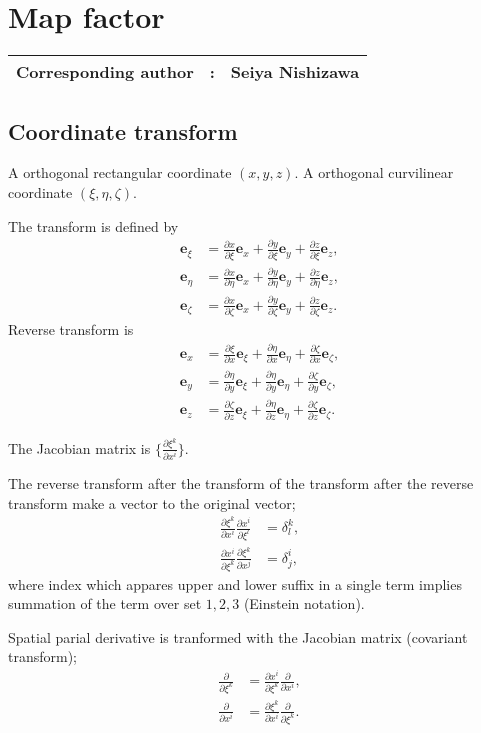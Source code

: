 \documentclass{book}
\begin{document}
\chapter{Map factor}
\label{chap: map factor}
{\bf \Large 
\begin{tabular}{ccc}
\hline
  Corresponding author & : & Seiya Nishizawa\\
\hline
\end{tabular}
}

\newcommand{\pd}[2]{\frac{\partial #1}{\partial #2}}


\section{Coordinate transform}
A orthogonal rectangular coordinate $(x, y, z)$.
A orthogonal curvilinear coordinate $(\xi, \eta, \zeta)$.


The transform is defined by
\begin{align}
  \bm{e}_\xi &= \pd{x}{\xi}\bm{e}_x + \pd{y}{\xi}\bm{e}_y + \pd{z}{\xi}\bm{e}_z, \\
  \bm{e}_\eta &= \pd{x}{\eta}\bm{e}_x + \pd{y}{\eta}\bm{e}_y + \pd{z}{\eta}\bm{e}_z, \\
  \bm{e}_\zeta &= \pd{x}{\zeta}\bm{e}_x + \pd{y}{\zeta}\bm{e}_y + \pd{z}{\zeta}\bm{e}_z.
\end{align}
Reverse transform is
\begin{align}
  \bm{e}_x &= \pd{\xi}{x}\bm{e}_\xi + \pd{\eta}{x}\bm{e}_\eta + \pd{\zeta}{x}\bm{e}_\zeta, \\
  \bm{e}_y &= \pd{\eta}{y}\bm{e}_\xi + \pd{\eta}{y}\bm{e}_\eta + \pd{\zeta}{y}\bm{e}_\zeta, \\
  \bm{e}_z &= \pd{\zeta}{z}\bm{e}_\xi + \pd{\eta}{z}\bm{e}_\eta + \pd{\zeta}{z}\bm{e}_\zeta.
\end{align}

The Jacobian matrix is $\{\pd{\xi^k}{x^i}\}$.


The reverse transform after the transform of the transform after the reverse transform make a vector to the original vector;
\begin{align}
  \pd{\xi^k}{x^i}\pd{x^i}{\xi^l} &= \delta_l^k, \\
  \pd{x^i}{\xi^k}\pd{\xi^k}{x^j} &= \delta_j^i,
\end{align}
where index which appares upper and lower suffix in a single term implies summation of the term over set ${1,2,3}$ (Einstein notation).


Spatial parial derivative is tranformed with the Jacobian matrix (covariant transform);
\begin{align}
  \pd{}{\xi^k} &= \pd{x^i}{\xi^k}\pd{}{x^i}, \\
  \pd{}{x^i} &= \pd{\xi^k}{x^i}\pd{}{\xi^k}.
\end{align}
\end{document}
